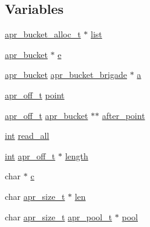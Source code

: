 \subsection*{Variables}
\begin{DoxyCompactItemize}
\item 
\hyperlink{structapr__bucket__alloc__t}{apr\+\_\+bucket\+\_\+alloc\+\_\+t} $\ast$ \hyperlink{group__APR__Util__Bucket__Brigades_gad0aa8f234e9d6458684fdb8db87d4db4}{list}
\item 
\hyperlink{structapr__bucket}{apr\+\_\+bucket} $\ast$ \hyperlink{group__APR__Util__Bucket__Brigades_gacd90314acb2c2e5cd19681136c08efac}{e}
\item 
\hyperlink{structapr__bucket}{apr\+\_\+bucket} \hyperlink{structapr__bucket__brigade}{apr\+\_\+bucket\+\_\+brigade} $\ast$ \hyperlink{group__APR__Util__Bucket__Brigades_gab35e0a3ed8c0326a9cb61bc42054e20d}{a}
\item 
\hyperlink{group__apr__platform_ga6938af9075cec15c88299109381aa984}{apr\+\_\+off\+\_\+t} \hyperlink{group__APR__Util__Bucket__Brigades_gaa171c51f2fad7a4b51dcb4c4347c78a6}{point}
\item 
\hyperlink{group__apr__platform_ga6938af9075cec15c88299109381aa984}{apr\+\_\+off\+\_\+t} \hyperlink{structapr__bucket}{apr\+\_\+bucket} $\ast$$\ast$ \hyperlink{group__APR__Util__Bucket__Brigades_gad94b78a8a65bce49b41a534acf716151}{after\+\_\+point}
\item 
\hyperlink{pcre_8txt_a42dfa4ff673c82d8efe7144098fbc198}{int} \hyperlink{group__APR__Util__Bucket__Brigades_ga80716da2e4f477e5575cf941af57749c}{read\+\_\+all}
\item 
\hyperlink{pcre_8txt_a42dfa4ff673c82d8efe7144098fbc198}{int} \hyperlink{group__apr__platform_ga6938af9075cec15c88299109381aa984}{apr\+\_\+off\+\_\+t} $\ast$ \hyperlink{group__APR__Util__Bucket__Brigades_gae8609cee12b4a979fa07fe431b3ee0fb}{length}
\item 
char $\ast$ \hyperlink{group__APR__Util__Bucket__Brigades_gaed82350c47c430d0a5114fb7031c85f5}{c}
\item 
char \hyperlink{group__apr__platform_gaaa72b2253f6f3032cefea5712a27540e}{apr\+\_\+size\+\_\+t} $\ast$ \hyperlink{group__APR__Util__Bucket__Brigades_ga36f4a31e320c8f18d8691ce72c8dc166}{len}
\item 
char \hyperlink{group__apr__platform_gaaa72b2253f6f3032cefea5712a27540e}{apr\+\_\+size\+\_\+t} \hyperlink{structapr__pool__t}{apr\+\_\+pool\+\_\+t} $\ast$ \hyperlink{group__APR__Util__Bucket__Brigades_gac7a47d301180bf52fea617f84c3af57e}{pool}
\item 
$$
\end{DoxyCompactItemize}
